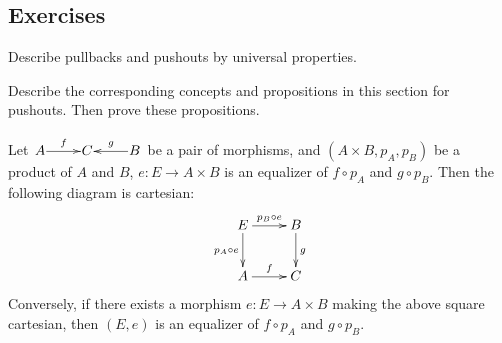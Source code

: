 \subsection{Exercises}
  \begin{ex}
    Describe pullbacks and pushouts by universal properties.
  \end{ex}
  \begin{ex}
    Describe the corresponding concepts and propositions in this section for pushouts. Then prove these propositions.
  \end{ex}
  \begin{ex}\label{prop:pullback=eq+prod}
    Let $\xymatrix@1{A\ar[r]^{f}&C&B\ar[l]_{g}}$ be a pair of morphisms, and $(A\times B, p_A, p_B)$ be a product of $A$ and $B$, $e\colon E\to A\times B$ is an equalizer of $f\circ p_A$ and $g\circ p_B$. Then the following diagram is cartesian:
    \begin{displaymath}
      \xymatrix{
         E\ar[r]^{p_B\circ e}\ar[d]_{p_A\circ e}&B\ar[d]^{g}\\
         A\ar[r]^{f}&C
      }
    \end{displaymath}
    Conversely, if there exists a morphism $e\colon E\to A\times B$ making the above square cartesian, then $(E,e)$ is an equalizer of $f\circ p_A$ and $g\circ p_B$.
  \end{ex}

